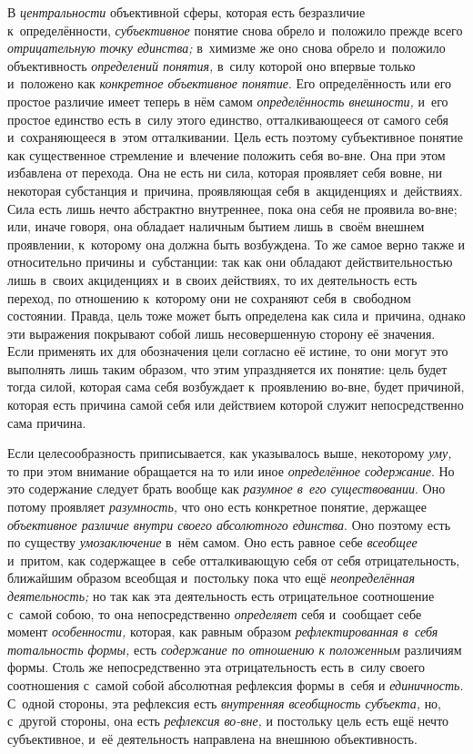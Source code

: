 В {\em центральности} объективной сферы, которая есть безразличие
к~определённости, {\em субъективное}
понятие снова обрело и~положило прежде всего
{\em отрицательную точку единства;}
в~химизме же оно снова обрело и~положило объективность
{\em определений понятия,}
в~силу которой оно впервые только и~положено как
{\em конкретное объективное понятие}.
Его определённость или его простое различие имеет теперь в
нём самом {\em определённость
внешности,} и~его простое единство есть в~силу этого
единство, отталкивающееся от самого себя и~сохраняющееся в~этом
отталкивании. Цель есть поэтому субъективное понятие как существенное
стремление и~влечение положить себя во-вне. Она при этом избавлена от
перехода. Она не есть ни сила, которая проявляет себя вовне, ни некоторая
субстанция и~причина, проявляющая себя в~акциденциях и~действиях. Сила есть
лишь нечто абстрактно внутреннее, пока она себя не проявила во-вне; или,
иначе говоря, она обладает наличным бытием лишь в~своём внешнем проявлении,
к~которому она должна быть возбуждена. То же самое верно также и
относительно причины и~субстанции: так как они обладают действительностью
лишь в~своих акциденциях и~в своих действиях, то их деятельность есть
переход, по отношению к~которому они не сохраняют себя в~свободном
состоянии. Правда, цель тоже может быть определена как сила и~причина,
однако эти выражения покрывают собой лишь несовершенную сторону её
значения. Если применять их для обозначения цели согласно её истине, то они
могут это выполнять лишь таким образом, что этим упраздняется их понятие:
цель будет тогда силой, которая сама себя возбуждает к~проявлению во-вне,
будет причиной, которая есть причина самой себя или действием которой
служит непосредственно сама причина.

Если целесообразность приписывается, как указывалось выше,
некоторому {\em уму,} то
при этом внимание обращается на то или иное
{\em определённое содержание}.
Но это содержание следует брать вообще как
{\em разумное в~его существовании}.
Оно потому проявляет
{\em разумность,} что оно
есть конкретное понятие, держащее
{\em объективное различие внутри своего
абсолютного единства}. Оно поэтому есть по существу
{\em умозаключение} в~нём
самом. Оно есть равное себе
{\em всеобщее} и~притом,
как содержащее в~себе отталкивающую себя от себя
отрицательность, ближайшим образом всеобщая и~постольку пока
что ещё {\em неопределённая
деятельность;} но так как эта деятельность есть
отрицательное соотношение с~самой собою, то она непосредственно
{\em определяет} себя и~сообщает себе момент {\em особенности,}
которая, как равным образом {\em рефлектированная в~себя тотальность
формы,} есть {\em содержание по отношению к
положенным} различиям формы. Столь же непосредственно эта
отрицательность есть в~силу своего соотношения с~самой собой абсолютная
рефлексия формы в~себя и {\em единичность}.
С~одной стороны, эта рефлексия есть {\em внутренняя всеобщность субъекта,}
но, с~другой стороны, она есть {\em рефлексия во-вне,} и
постольку цель есть ещё нечто субъективное, и~её деятельность направлена на
внешнюю объективность.

